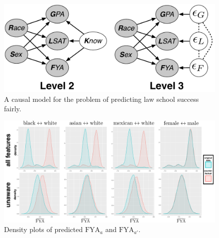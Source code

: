 \begin{figure}[th]
\begin{center}
\vspace{-1ex}
\centerline{\includegraphics[width=0.8\columnwidth]{law_school_model}}
\vspace{-2ex}
\caption{A causal model for the problem of predicting law school success fairly.\label{figure.law_school}\vspace{-2ex}}
\vspace{-2ex}
\end{center}
\end{figure}


\begin{figure}[th]
\begin{center}
 \label{figure.counterfactual}
\vspace{-1ex}
\centerline{\includegraphics[width=\columnwidth]{counterfactual}}
\vspace{-2ex}
\caption{Density plots of predicted $\mbox{FYA}_a$ and $\mbox{FYA}_{a'}$.}
\vspace{-2ex}
\end{center}
\end{figure}



